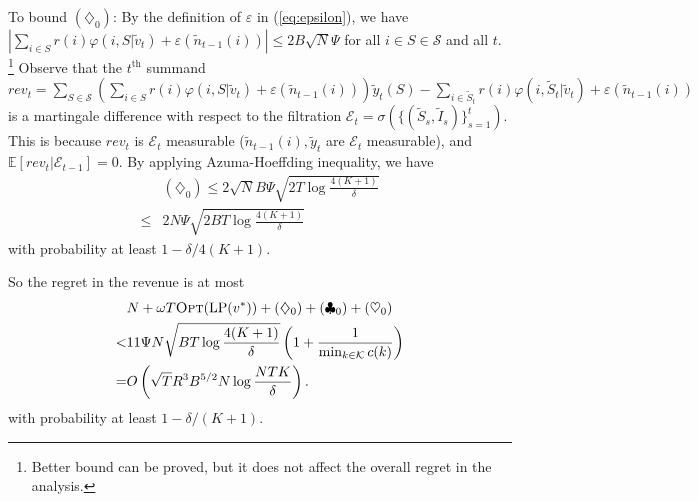 \documentclass{article}
\theoremstyle{definition}
\newcommand{\EEE}{\mathbb{E}}
\newcommand{\eee}{\mathcal{E}}
\newcommand{\KKK}{\mathcal{K}}
\newcommand{\SSS}{\mathcal{S}}
\begin{document}
To bound $(\diamondsuit_0)$: By the definition of $\varepsilon$ in (\ref{eq:epsilon}), we have $\left|\sum_{i\in S} r(i) \varphi(i, S|\tilde{v}_t) + \varepsilon(\tilde{n}_{t-1}(i))\right| \leq 2B\sqrt{N}\Psi$ for all $i\in S\in\SSS$ and all $t$. \footnote{Better bound can be proved, but it does not affect the overall regret in the analysis.} Observe that the $t^\text{th}$ summand $rev_t =  \sum_{S\in\SSS}\left(\sum_{i\in S} r(i) \varphi(i, S|\tilde{v}_t) + \varepsilon(\tilde{n}_{t-1}(i))\right)\tilde{y}_t(S)- \sum_{i\in \tilde{S}_t} r(i) \varphi(i, \tilde{S}_t|\tilde{v}_t) + \varepsilon(\tilde{n}_{t-1}(i))$ is a martingale difference with respect to the filtration $\eee_t = \sigma(\{(\tilde{S}_s, \tilde{I}_s)\}^t_{s = 1})$. This is because $rev_t$ is $\eee_t$ measurable ($\tilde{n}_{t-1}(i), \tilde{y}_t$ are $\eee_t$ measurable), and $\EEE[rev_t | \eee_{t-1}] = 0$. By applying Azuma-Hoeffding inequality, we have
\begin{align*}
&(\diamondsuit_0) \leq 2\sqrt{N}B\Psi\sqrt{2T\log{\frac{4(K+1)}{\delta}}}\nonumber\\
\leq & 2N\Psi\sqrt{2BT\log\frac{4(K+1)}{\delta}}
\end{align*}
with probability at least $1 - \delta/4(K+1)$.

So the regret in the revenue is at most 
\begin{align}
&N +  \omega  T\text{{\sc Opt}}(\text{LP}(v^*))+ (\diamondsuit_0) + (\clubsuit_0) + (\heartsuit_0) \nonumber\\
< &  11\Psi N\sqrt{BT\log{\frac{4(K+1)}{\delta}}}\left(1 + \frac{1}{\min_{k\in \KKK}c(k)}\right) \label{eq:preciseregret}\\
= &O\left(\sqrt{T} R^3  B^{5/2}N\log{\frac{NTK}{\delta}}\right)\nonumber .
\end{align} 
with probability at least $1-\delta/(K+1)$.
\end{document}

